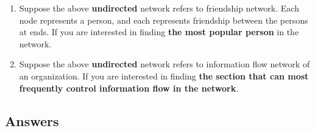 \documentclass{exmppr}
\begin{document}
\begin{enumerate}

\begin{enumerate}
\item Suppose the above \textbf{undirected} network refers to friendship network. Each node represents a person, and each represents friendship between the persons at ends. If you are interested in finding \textbf{the most popular person} in the network.
\item Suppose the above \textbf{undirected} network refers to information flow network of an organization. If you are interested in finding \textbf{the section that can most frequently control information flow in the network}.
\end{enumerate}
\end{enumerate}


\newpage
\begin{center}\section*{Answers}\end{center}
%
\end{document}
